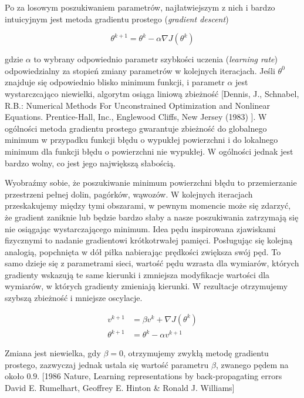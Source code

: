 \documentclass[]{article}
\theoremstyle{definition}
\begin{document}
Po za losowym poszukiwaniem parametrów, najłatwiejszym z nich i bardzo intuicyjnym jest metoda gradientu prostego (\textit{gradient descent})


\begin{equation}
\theta^{k+1} = \theta^{k} - \alpha \nabla J(\theta^{k})
\end{equation}


gdzie $\alpha$ to wybrany odpowiednio parametr szybkości uczenia (\textit{learning rate}) odpowiedzialny za stopień zmiany parametrów w kolejnych iteracjach. Jeśli $\theta^0$ znajduje się odpowiednio blisko minimum funkcji, i parametr $\alpha$ jest wystarczcająco niewielki, algorytm osiąga liniową zbieżność [Dennis, J., Schnabel, R.B.: Numerical Methods For Unconstrained Optimization and Nonlinear Equations. Prentice-Hall, Inc., Englewood Cliffs, New Jersey (1983)
]. W ogólności metoda gradientu prostego gwarantuje zbieżność do globalnego minimum w przypadku funkcji błędu o wypukłej powierzchni i do lokalnego minimum dla funkcji błędu o powierzchni nie wypukłej. W ogólności jednak jest bardzo wolny, co jest jego największą słabością.

Wyobraźmy sobie, że poszukiwanie minimum powierzchni błędu to przemierzanie przestrzeni pełnej dolin, pagórków, wąwozów. W kolejnych iteracjach przeskakujemy między tymi obszarami, w pewnym momencie może się zdarzyć, że gradient zaniknie lub będzie bardzo słaby a nasze poszukiwania zatrzymają się nie osiągając wystarczającego minimum. Idea pędu inspirowana zjawiskami fizycznymi to nadanie gradientowi krótkotrwałej pamięci. Posługując się kolejną analogią, popchnięta w dół piłka nabierając prędkości zwiększa swój pęd. To samo dzieje się z parametrami sieci, wartość pędu wzrasta dla wymiarów, których gradienty wskazują te same kierunki i zmniejsza modyfikacje wartości dla wymiarów, w których gradienty zmieniają kierunki. W rezultacje otrzymujemy szybszą zbieżność i mniejsze oscylacje.

\begin{align} 
v^{k+1} &=  \beta v^{k}+ \nabla J(\theta^{k}) \\[0.4em]
\theta^{k+1} &=  \theta^{k }- \alpha v^{k+1}
\end{align}

Zmiana jest niewielka, gdy $\beta = 0$, otrzymujemy zwykłą metodę gradientu prostego, zazwyczaj jednak ustala się wartość parametru $\beta$, zwanego pędem na około $0.9$. [1986 Nature, Learning representations by back-propagating errors
David E. Rumelhart, Geoffrey E. Hinton \& Ronald J. Williams] 
\end{document}
